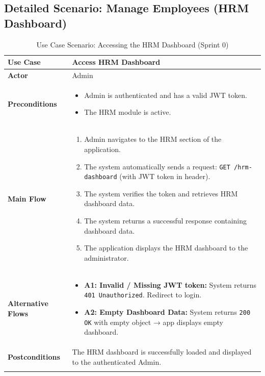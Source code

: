 \subsection{Detailed Scenario: Manage Employees (HRM Dashboard)}
\begin{longtable}{|p{3cm}|p{11cm}|}
\hline
\textbf{Use Case} & Access HRM Dashboard \\
\hline
\textbf{Actor} & Admin \\
\hline
\textbf{Preconditions} &
\begin{minipage}[t]{10cm}
\begin{itemize}
    \item Admin is authenticated and has a valid JWT token.
    \item The HRM module is active.
\end{itemize}
\end{minipage} \\
\hline
\textbf{Main Flow} &
\begin{minipage}[t]{10cm}
\begin{enumerate}
    \item Admin navigates to the HRM section of the application.
    \item The system automatically sends a request: \texttt{GET /hrm-dashboard} (with JWT token in header).
    \item The system verifies the token and retrieves HRM dashboard data.
    \item The system returns a successful response containing dashboard data.
    \item The application displays the HRM dashboard to the administrator.
\end{enumerate}
\end{minipage} \\
\hline
\textbf{Alternative Flows} &
\begin{minipage}[t]{10cm}
\begin{itemize}
    \item \textbf{A1: Invalid / Missing JWT token:} System returns \texttt{401 Unauthorized}. Redirect to login.
    \item \textbf{A2: Empty Dashboard Data:} System returns \texttt{200 OK} with empty object → app displays empty dashboard.
\end{itemize}
\end{minipage} \\
\hline
\textbf{Postconditions} & 
\begin{minipage}[t]{10cm}
The HRM dashboard is successfully loaded and displayed to the authenticated Admin.
\end{minipage} \\
\hline
\caption{Use Case Scenario: Accessing the HRM Dashboard (Sprint 0)}
\label{tab:usecase_hrm_dashboard}
\end{longtable}


